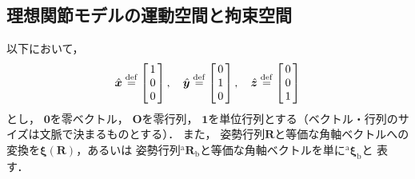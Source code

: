 ﻿\documentclass[a4paper]{jsarticle}
\begin{document}
\subsection{理想関節モデルの運動空間と拘束空間}

以下において，
\begin{align*}
\hat{\bm{x}}\overset{\mathrm{def}}{=}\left[\begin{array}{@{\,}c@{\,}}
 1 \\ 0 \\ 0
\end{array}\right],\quad
\hat{\bm{y}}\overset{\mathrm{def}}{=}\left[\begin{array}{@{\,}c@{\,}}
 0 \\ 1 \\ 0
\end{array}\right],\quad
\hat{\bm{z}}\overset{\mathrm{def}}{=}\left[\begin{array}{@{\,}c@{\,}}
 0 \\ 0 \\ 1
\end{array}\right]
\end{align*}
とし，
$\bm{0}$を零ベクトル，
$\bm{O}$を零行列，
$\bm{1}$を単位行列とする（ベクトル・行列のサイズは文脈で決まるものとする）．
また，
姿勢行列$\bm{R}$と等価な角軸ベクトルへの変換を$\bm{\xi}(\bm{R})$，あるいは
姿勢行列${}^{\mathrm{a}}\bm{R}_{\mathrm{b}}$と等価な角軸ベクトルを単に${}^{\mathrm{a}}\bm{\xi}_{\mathrm{b}}$と
表す．
\end{document}
